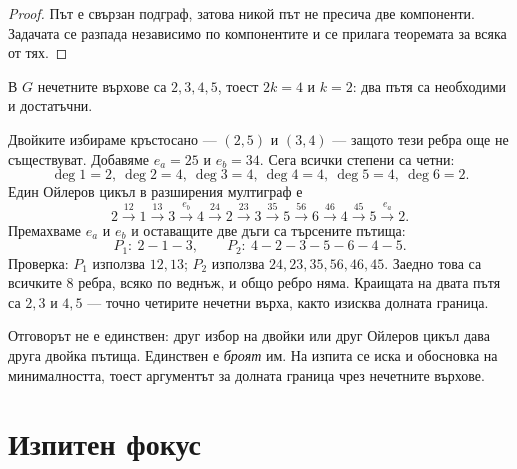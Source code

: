 \begin{proof}
Път е свързан подграф, затова никой път не пресича две компоненти. Задачата се
разпада независимо по компонентите и се прилага теоремата за всяка от тях.
\end{proof}

\begin{example}[Разбиване на $G$]
В $G$ нечетните върхове са $2,3,4,5$, тоест $2k=4$ и $k=2$: два пътя са
необходими и достатъчни.

Двойките избираме кръстосано --- $(2,5)$ и $(3,4)$ --- защото тези ребра още не
съществуват. Добавяме $e_a=25$ и $e_b=34$. Сега всички степени са четни:
\[
\deg 1=2,\ \deg 2=4,\ \deg 3=4,\ \deg 4=4,\ \deg 5=4,\ \deg 6=2 .
\]
Един Ойлеров цикъл в разширения мултиграф е
\[
2\xrightarrow{12}1\xrightarrow{13}3\xrightarrow{e_b}4\xrightarrow{24}2
\xrightarrow{23}3\xrightarrow{35}5\xrightarrow{56}6\xrightarrow{46}4
\xrightarrow{45}5\xrightarrow{e_a}2 .
\]
Премахваме $e_a$ и $e_b$ и оставащите две дъги са търсените пътища:
\[
P_1:\ 2-1-3,
\qquad
P_2:\ 4-2-3-5-6-4-5 .
\]
Проверка: $P_1$ използва $12,13$; $P_2$ използва $24,23,35,56,46,45$. Заедно това
са всичките $8$ ребра, всяко по веднъж, и общо ребро няма. Краищата на двата
пътя са $2,3$ и $4,5$ --- точно четирите нечетни върха, както изисква долната
граница.
\end{example}

\begin{remark}
Отговорът не е единствен: друг избор на двойки или друг Ойлеров цикъл дава друга
двойка пътища. Единствен е \emph{броят} им. На изпита се иска и обосновка на
минималността, тоест аргументът за долната граница чрез нечетните върхове.
\end{remark}

\section{Изпитен фокус}\label{s:3.8}

